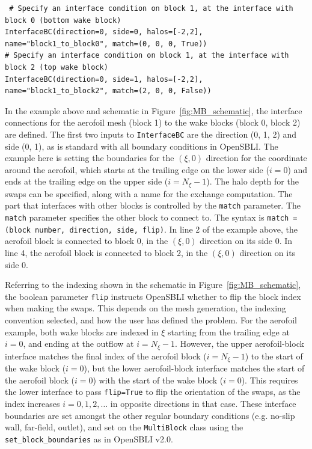 \documentclass[11pt]{article}
\begin{document}
 \begin{lstlisting}
 # Specify an interface condition on block 1, at the interface with block 0 (bottom wake block)
InterfaceBC(direction=0, side=0, halos=[-2,2], name="block1_to_block0", match=(0, 0, 0, True))
# Specify an interface condition on block 1, at the interface with block 2 (top wake block)
InterfaceBC(direction=0, side=1, halos=[-2,2], name="block1_to_block2", match=(2, 0, 0, False))
\end{lstlisting}

In the example above and schematic in Figure~\ref{fig:MB_schematic}, the interface connections for the aerofoil mesh (block 1) to the wake blocks (block 0, block 2) are defined. The first two inputs to \verb|InterfaceBC| are the direction (0, 1, 2) and side (0, 1), as is standard with all boundary conditions in OpenSBLI. The example here is setting the boundaries for the $(\xi, 0)$ direction for the coordinate around the aerofoil, which starts at the trailing edge on the lower side ($i=0$) and ends at the trailing edge on the upper side ($i=N_\xi - 1$). The halo depth for the swaps can be specified, along with a name for the exchange computation. The part that interfaces with other blocks is controlled by the \verb|match| parameter. The \verb|match| parameter specifies the other block to connect to. The syntax is \verb|match = (block number, direction, side, flip)|. In line 2 of the example above, the aerofoil block is connected to block 0, in the $(\xi, 0)$ direction on its side 0. In line 4, the aerofoil block is connected to block 2, in the $(\xi, 0)$ direction on its side 0.

Referring to the indexing shown in the schematic in Figure~\ref{fig:MB_schematic}, the boolean parameter \verb|flip| instructs OpenSBLI whether to flip the block index when making the swaps. This depends on the mesh generation, the indexing convention selected, and how the user has defined the problem. For the aerofoil example, both wake blocks are indexed in $\xi$ starting from the trailing edge at $i=0$, and ending at the outflow at $i=N_\xi-1$. However, the upper aerofoil-block interface matches the final index of the aerofoil block ($i=N_\xi - 1$) to the start of the wake block ($i=0$), but the lower aerofoil-block interface matches the start of the aerofoil block ($i=0$) with the start of the wake block ($i=0$). This requires the lower interface to pass \verb|flip=True| to flip the orientation of the swaps, as the index increases $i=0, 1, 2, \dots$ in opposite directions in that case. These interface boundaries are set amongst the other regular boundary conditions (e.g. no-slip wall, far-field, outlet), and set on the \verb|MultiBlock| class using the \verb|set_block_boundaries| as in OpenSBLI v2.0.
\end{document}
